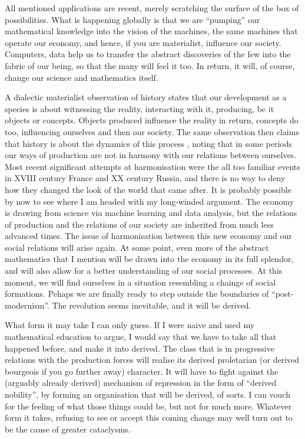 \documentclass{article}
\begin{document}
All mentioned applications are recent, merely scratching the surface of the box of possibilities. What is happening globally is that we are “pumping” our mathematical knowledge into the vision of the machines, the same machines that operate our economy, and hence, if you are materialist, influence our society. Computers, data help us to transfer the abstract discoveries of the few into the fabric of our being, so that the many will feel it too. In return, it will, of course, change our science and mathematics itself.

A dialectic materialist observation of history states that our development as a species is about witnessing the reality, interacting with it, producing, be it objects or concepts. Objects produced influence the reality in return, concepts do too, influencing ourselves and then our society. The same observation then claims that history is about the dynamics of this process  \cite{MARX,MARXENGCPE}, noting that in some periods our ways of production are not in harmony with our relations between ourselves. Most recent significant attempts at harmonisation were the all too familiar events in XVIII century France and XX century Russia, and there is no way to deny how they changed the look of the world that came after. It is probably possible by now to see where I am headed with my long-winded argument. The economy is drawing from science via machine learning and data analysis,
but the relations of production and the relations of our society are inherited from much less advanced times.
The issue of harmonisation between this new economy and our social relations will arise again. At some point, even more of the abstract mathematics that I mention will be drawn into the economy in its full splendor, and will also allow for a better understanding of our social processes. At this moment, we will find ourselves
in a situation resembling a chainge of social formations. Pehaps we are finally ready to step outside the
boundaries of ``post-modernism''.
The revolution seems inevitable, and it will be derived.

What form it may take I can only guess. If I were naive and used my mathematical education to argue, I would say that we have to take all that happened before, and make it into derived. The class that is in progressive relations with the production forces will realise its derived proletarian (or derived bourgeois if you go further away) character. It will have to fight against the (arguably already derived) mechanism of repression in the form of ``derived nobility'', by forming an organisation that will be derived, of sorts. I can vouch for the feeling of what those things could be, but not for much more. Whatever form it takes, refusing to see or accept this coming change may well turn out to be the cause of greater cataclysms.
\end{document}
